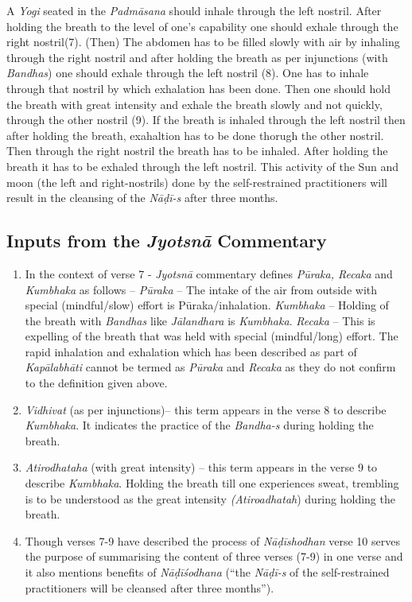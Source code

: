 A \textit{Yogi} seated in the \textit{Padmāsana} should inhale through the left nostril. After holding the breath to the level of one’s capability one should exhale through the right nostril(7). (Then) The abdomen has to be filled slowly with air by inhaling through the right nostril and after holding the breath as per injunctions (with  \textit{Bandhas}) one should exhale through the left nostril (8). One has to inhale through that nostril by which exhalation has been done. Then one should hold the breath with great intensity and exhale the breath slowly and not quickly, through the other nostril (9).  If the breath is inhaled through the left nostril then after holding the breath, exahaltion has to be done thorugh the other nostril. Then through the right nostril the breath has to be inhaled. After holding the breath it has to be exhaled through the left nostril. This activity of the Sun and moon (the left and right-nostrils) done by the self-restrained practitioners will result in the cleansing of the \textit{Nāḍī-s} after three months. 

\subsection*{Inputs from the \textit{Jyotsnā} Commentary}


\begin{enumerate}
\item In the context of verse 7 - \textit{Jyotsnā} commentary defines  \textit{Pūraka, Recaka} and \textit{Kumbhaka} as follows –  \textit{Pūraka} – The intake of the air from outside with special (mindful/slow) effort  is Pūraka/inhalation. \textit{Kumbhaka} – Holding of the breath with  \textit{Bandhas} like  \textit{Jālandhara} is \textit{Kumbhaka}.  \textit{Recaka} – This is expelling of the breath that was held with special (mindful/long) effort. The rapid inhalation and exhalation which has been described as part of \textit{Kapālabhāti} cannot be termed as  \textit{Pūraka} and \textit{Recaka} as they do not confirm to the definition given above. 
\item \textit{Vidhivat} (as per injunctions)– this term appears in the verse 8 to describe \textit{Kumbhaka}. It indicates the practice of the  \textit{Bandha-s} during holding the breath. 
\item  \textit{Atirodhataha} (with great intensity) – this term appears in the verse 9 to describe \textit{Kumbhaka}. Holding the breath till one experiences sweat, trembling is to be understood as the great intensity \textit{(Atiroadhatah}) during holding the breath.
\item Though verses 7-9 have described the process of \textit{Nāḍīshodhan} verse 10 serves the purpose of summarising the content of three verses (7-9) in one verse and it also mentions benefits of \textit{Nāḍīśodhana} (“the \textit{Nāḍī-s} of the self-restrained practitioners will be cleansed after three months”). 
\end{enumerate}

